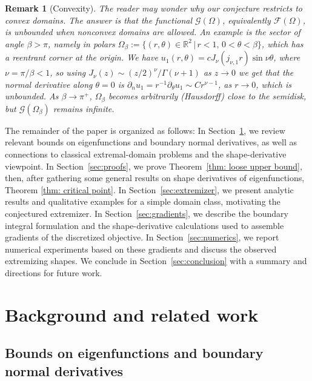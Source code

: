 \documentclass{amsart}
\newcommand{\R}{\mathbb{R}}
\theoremstyle{plain}
\newtheorem{remark}[theorem]{Remark}
\begin{document}
\begin{remark}[Convexity]
  The reader may wonder why our conjecture restricts to convex domains.
  The answer is that the functional ${\mathcal G}(\Omega)$, equivalently
  ${\mathcal F}(\Omega)$,
  is unbounded when nonconvex domains are allowed.
  An example is the sector of angle $\beta>\pi$, namely in polars
  $\Omega_\beta := \{ (r,\theta)\in\R^2 \, | \, r<1, \, 0<\theta<\beta\}$,
  which has a {\em reentrant corner} at the origin.
  We have $u_1(r,\theta) = c J_\nu(j_{\nu,1}r) \sin \nu\theta$,
  where $\nu = \pi/\beta < 1$, so
  using $J_\nu(z) \sim (z/2)^\nu/\Gamma(\nu+1)$ as $z\to0$ we
  get
  that the normal derivative along $\theta=0$
  is $\partial_n u_1 = r^{-1} \partial_\theta u_1 \sim C r^{\nu-1}$,
  as $r\to 0$, which is unbounded.
  As $\beta\to\pi^+$, $\Omega_\beta$ becomes arbitrarily (Hausdorff) close
  to the semidisk,
  but ${\mathcal G}(\Omega_\beta)$ remains infinite.
  \end{remark}

The remainder of the paper is organized as follows: In Section~\ref{sec:background}, we review relevant bounds on eigenfunctions and boundary normal derivatives, as well as connections to classical extremal-domain problems and the shape-derivative viewpoint. In Section~\ref{sec:proofs}, we prove Theorem~\ref{thm: loose upper bound}, then, after gathering some general results on shape derivatives of eigenfunctions, Theorem \ref{thm: critical point}.  In Section~\ref{sec:extremizer}, we present analytic results and qualitative examples for a simple domain class, motivating the conjectured extremizer. In Section~\ref{sec:gradients}, we describe the boundary integral formulation and the shape-derivative calculations used to assemble gradients of the discretized objective. In Section~\ref{sec:numerics}, we report numerical experiments based on these gradients and discuss the observed extremizing shapes. We conclude in Section~\ref{sec:conclusion} with a summary and directions for future work.

\section{Background and related work}\label{sec:background}

\subsection{Bounds on eigenfunctions and boundary normal derivatives}
\end{document}
